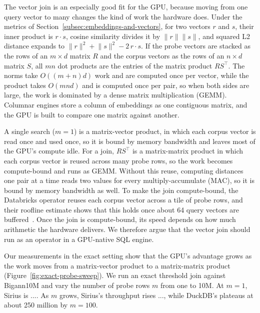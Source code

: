 The vector join is an especially good fit for the GPU, because moving from one query vector to many changes the kind of work the hardware does.
Under the metrics of Section~\ref{subsec:embeddings-and-vectors}, for two vectors $r$ and $s$, their inner product is $r \cdot s$, cosine similarity divides it by $\lVert r \rVert \lVert s \rVert$, and squared L2 distance expands to $\lVert r \rVert^2 + \lVert s \rVert^2 - 2\, r \cdot s$.
If the probe vectors are stacked as the rows of an $m \times d$ matrix $R$ and the corpus vectors as the rows of an $n \times d$ matrix $S$, all $mn$ dot products are the entries of the matrix product $RS^\top$.
The norms take $O((m+n)d)$ work and are computed once per vector, while the product takes $O(mnd)$ and is computed once per pair, so when both sides are large, the work is dominated by a dense matrix multiplication (GEMM).
Columnar engines store a column of embeddings as one contiguous matrix, and the GPU is built to compare one matrix against another.

A single search ($m=1$) is a matrix-vector product, in which each corpus vector is read once and used once, so it is bound by memory bandwidth and leaves most of the GPU's compute idle.
For a join, $RS^\top$ is a matrix-matrix product in which each corpus vector is reused across many probe rows, so the work becomes compute-bound and runs as GEMM.
Without this reuse, computing distances one pair at a time reads two values for every multiply-accumulate (MAC), so it is bound by memory bandwidth as well.
To make the join compute-bound, the Databricks operator reuses each corpus vector across a tile of probe rows, and their roofline estimate shows that this holds once about 64 query vectors are buffered~\cite{DatabricksNearestByJoinBlog26}.
Once the join is compute-bound, its speed depends on how much arithmetic the hardware delivers.
We therefore argue that the vector join should run as an operator in a GPU-native SQL engine.



Our measurements in the exact setting show that the GPU's advantage grows as the work moves from a matrix-vector product to a matrix-matrix product (Figure~\ref{fig:exact-probe-sweep}).
We run an exact threshold join against Bigann10M and vary the number of probe rows $m$ from one to 10M\@.
At $m=1$, Sirius is ....
As $m$ grows, Sirius's throughput rises ..., while DuckDB's plateaus at about 250 million by $m=100$.
